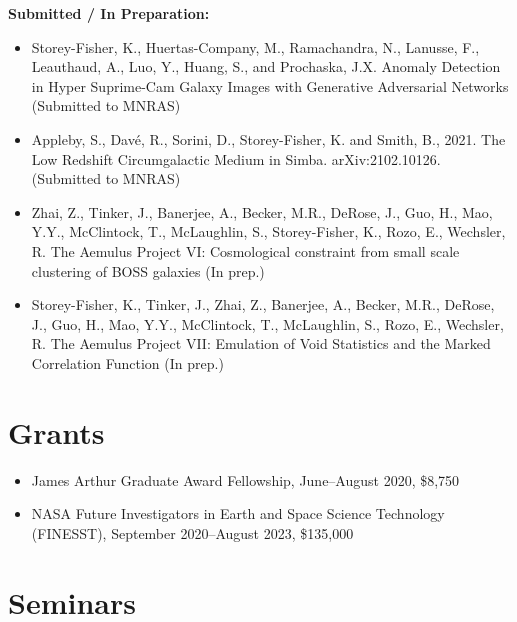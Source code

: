 \documentclass{article}
\begin{document}
\noindent \textbf{Submitted / In Preparation:}
\begin{itemize}
\item Storey-Fisher, K., Huertas-Company, M., Ramachandra, N., Lanusse, F., Leauthaud, A., Luo, Y., Huang, S., and Prochaska, J.X. Anomaly Detection in Hyper Suprime-Cam Galaxy Images with Generative Adversarial Networks (Submitted to MNRAS)
\item Appleby, S., Davé, R., Sorini, D., Storey-Fisher, K. and Smith, B., 2021. The Low Redshift Circumgalactic Medium in Simba. arXiv:2102.10126. (Submitted to MNRAS)
\item Zhai, Z., Tinker, J., Banerjee, A., Becker, M.R., DeRose, J., Guo, H., Mao, Y.Y., McClintock, T., McLaughlin, S.,  Storey-Fisher, K., Rozo, E., Wechsler, R. The Aemulus Project VI: Cosmological constraint from small scale clustering of BOSS galaxies (In prep.)
\item Storey-Fisher, K., Tinker, J., Zhai, Z., Banerjee, A., Becker, M.R., DeRose, J., Guo, H., Mao, Y.Y., McClintock, T., McLaughlin, S., Rozo, E., Wechsler, R. The Aemulus Project VII: Emulation of Void Statistics and the Marked Correlation Function (In prep.)
\end{itemize}

\section{Grants}

\begin{itemize}
\item James Arthur Graduate Award Fellowship, June--August 2020, \$8,750
\item NASA Future Investigators in Earth and Space Science Technology (FINESST), September 2020--August 2023, \$135,000
\end{itemize}

\section{Seminars}
\end{document}
